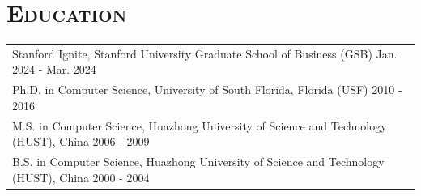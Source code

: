 \documentclass[letterpaper,11pt]{article} %
\begin{document}
\vspace*{-5pt}

\section{\Large\bf\textsc{Education}}

\begin{tabular}{p{18.5cm}}
{Stanford Ignite, Stanford University Graduate School of Business (GSB)} \hfill Jan. 2024 - Mar. 2024\\
{ Ph.D. in Computer Science, University of South Florida, Florida (USF)}  \hfill 2010 - 2016\\


%
{ M.S. in Computer Science, Huazhong University of Science and Technology (HUST), China} \hfill 2006 - 2009\\
{ B.S. in Computer Science, Huazhong University of Science and Technology (HUST), China} \hfill 2000 - 2004\\

\end{tabular}




\end{document}
